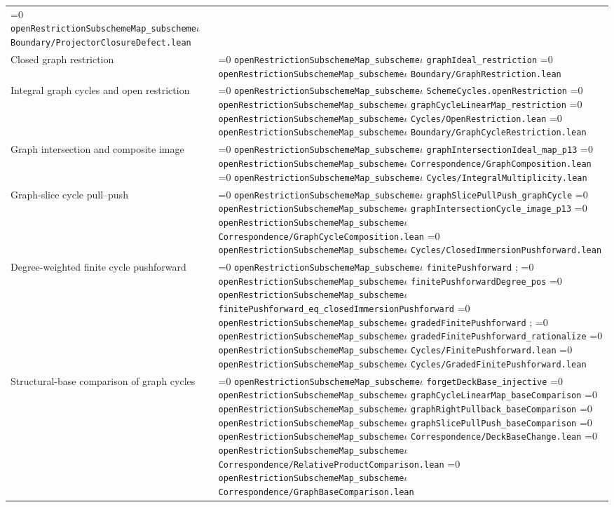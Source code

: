 \documentclass[11pt]{article}
\theoremstyle{definition}
\theoremstyle{remark}
\newcommand{\leanpath}[1]{%
  \ifnum\pdfstrcmp{\detokenize{#1}}%
      {\detokenize{openRestrictionSubschemeMap_subschemeι}}=0
    \texttt{\nolinkurl{openRestrictionSubschemeMap_subscheme}}\ensuremath{\iota}%
  \else
    \texttt{\nolinkurl{#1}}%
  \fi}
\begin{document}
\begin{longtable}{@{}>{\raggedright\arraybackslash}p{}
                >{\raggedright\arraybackslash}p{}@{}}
\leanpath{Boundary/ProjectorClosureDefect.lean}\\
Closed graph restriction &
\leanpath{graphIdeal_restriction}\newline
\leanpath{Boundary/GraphRestriction.lean}\\
Integral graph cycles and open restriction &
\leanpath{SchemeCycles.openRestriction}\newline
\leanpath{graphCycleLinearMap_restriction}\newline
\leanpath{Cycles/OpenRestriction.lean}\newline
\leanpath{Boundary/GraphCycleRestriction.lean}\\
Graph intersection and composite image &
\leanpath{graphIntersectionIdeal_map_p13}\newline
\leanpath{Correspondence/GraphComposition.lean}\newline
\leanpath{Cycles/IntegralMultiplicity.lean}\\
Graph-slice cycle pull--push &
\leanpath{graphSlicePullPush_graphCycle}\newline
\leanpath{graphIntersectionCycle_image_p13}\newline
\leanpath{Correspondence/GraphCycleComposition.lean}\newline
\leanpath{Cycles/ClosedImmersionPushforward.lean}\\
Degree-weighted finite cycle pushforward &
\leanpath{finitePushforward}; \leanpath{finitePushforwardDegree_pos}\newline
\leanpath{finitePushforward_eq_closedImmersionPushforward}\newline
\leanpath{gradedFinitePushforward}; \leanpath{gradedFinitePushforward_rationalize}\newline
\leanpath{Cycles/FinitePushforward.lean}\newline
\leanpath{Cycles/GradedFinitePushforward.lean}\\
Structural-base comparison of graph cycles &
\leanpath{forgetDeckBase_injective}\newline
\leanpath{graphCycleLinearMap_baseComparison}\newline
\leanpath{graphRightPullback_baseComparison}\newline
\leanpath{graphSlicePullPush_baseComparison}\newline
\leanpath{Correspondence/DeckBaseChange.lean}\newline
\leanpath{Correspondence/RelativeProductComparison.lean}\newline
\leanpath{Correspondence/GraphBaseComparison.lean}\newline

\end{longtable}
\end{document}
